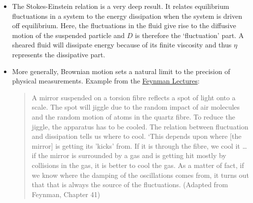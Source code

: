 \documentclass[
  letterpaper,
  enabledeprecatedfontcommands]{report}
\begin{document}
\begin{itemize}
\item
  The Stokes-Einstein relation is a very deep result. It relates
  equilibrium fluctuations in a system to the energy dissipation when
  the system is driven off equilibrium. Here, the fluctuations in the
  fluid give rise to the diffusive motion of the suspended particle and
  \(D\) is therefore the `fluctuation' part. A sheared fluid will
  dissipate energy because of its finite viscosity and thus \(\eta\)
  represents the dissipative part.
\item
  More generally, Brownian motion sets a natural limit to the precision
  of physical measurements. Example from the
  \href{https://www.feynmanlectures.caltech.edu/I_41.html}{Feynman
  Lectures}:

  \begin{quote}
  A mirror suspended on a torsion fibre reflects a spot of light onto a
  scale. The spot will jiggle due to the random impact of air molecules
  and the random motion of atoms in the quartz fibre. To reduce the
  jiggle, the apparatus has to be cooled. The relation between
  fluctuation and dissipation tells us where to cool. `This depends upon
  where {[}the mirror{]} is getting its 'kicks' from. If it is through
  the fibre, we cool it \ldots{} if the mirror is surrounded by a gas
  and is getting hit mostly by collisions in the gas, it is better to
  cool the gas. As a matter of fact, if we know where the damping of the
  oscillations comes from, it turns out that that is always the source
  of the fluctuations. (Adapted from Feynman, Chapter 41)
  \end{quote}
\end{itemize}
\end{document}
